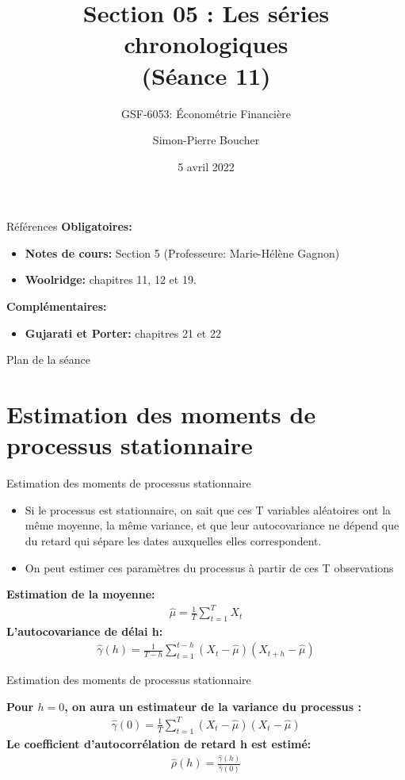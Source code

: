 \documentclass{beamer}
\title[S02 Régression et MCO]{Section 05 : Les séries chronologiques\\ (Séance 11)}
\subtitle{GSF-6053: Économétrie Financière}
\author[SP. Boucher]{Simon-Pierre Boucher\inst{1}}
\institute[Université Laval]
{
  \inst{1}%
  Département de finance, assurance et immobilier\\
  Faculté des sciences de l'administration\\
  Université Laval}
\date[Hiver 2022]{5 avril 2022}
\begin{document}
\begin{frame}
  \titlepage
\end{frame}


\begin{frame}{Références}
\textbf{Obligatoires:}
\begin{itemize}
\item \textbf{Notes de cours:} Section 5 (Professeure: Marie-Hélène Gagnon)
\item \textbf{Woolridge:} chapitres 11, 12 et 19.
\end{itemize}
\vspace{0.5cm}
\textbf{Complémentaires:}
\begin{itemize}
\item \textbf{Gujarati et Porter:} chapitres 21 et 22
\end{itemize}
\end{frame}

\begin{frame}{Plan de la séance}
  \tableofcontents
\end{frame}

\section{Estimation des moments de processus stationnaire}
\frame{\tableofcontents[current]}

\begin{frame}{Estimation des moments de processus stationnaire}
\begin{itemize}
\item Si le processus est stationnaire, on sait que ces T variables aléatoires ont la même moyenne, la même variance, et que leur autocovariance ne dépend que du retard qui sépare les dates auxquelles elles correspondent. 
\item On peut estimer ces paramètres du processus à partir de ces T observations
\end{itemize}
\textbf{Estimation de la moyenne:}
\begin{align*}
\hat{\mu}=\frac{1}{T}\sum_{t=1}^T X_t
\end{align*}
\textbf{L’autocovariance de délai h:}
\begin{align*}
\hat{\gamma}(h)=\frac{1}{T-h}\sum_{t=1}^{t-h}(X_t-\hat{\mu})(X_{t+h}-\hat{\mu})
\end{align*}
\end{frame}


\begin{frame}{Estimation des moments de processus stationnaire}

\textbf{Pour $h=0$, on aura un estimateur de la variance du processus :}
\begin{align*}
\hat{\gamma}(0)=\frac{1}{T}\sum_{t=1}^{T}(X_t-\hat{\mu})(X_t-\hat{\mu})
\end{align*}
\textbf{Le coefficient d’autocorrélation de retard h est estimé:}
\begin{align*}
\hat{\rho}(h)=\frac{\hat{\gamma}(h)}{\hat{\gamma}(0)}
\end{align*}
\end{frame}
\end{document}
